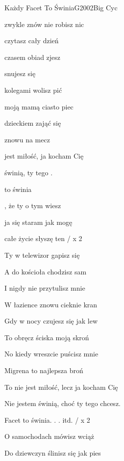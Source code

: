 \begin{song}{Każdy Facet To Świnia}{G}{2002}{Big Cyc}{}{}
  \begin{SBVerse}
     zwykle znów nie robisz nic

     czytasz cały dzień

     czasem obiad zjesz

     snujesz się 

     kolegami wolisz pić

     moją mamą ciasto piec

     dzieckiem zająć się

     znowu  na mecz

     jest miłość,  ja kocham Cię

     świnią,  ty tego .
  \end{SBVerse}
  \begin{SBChorus}
     to świnia

    , że ty o tym wiesz

     ja się staram jak mogę

     całe życie słyszę ten  / x 2
  \end{SBChorus}
  \begin{SBVerse}
    Ty w telewizor gapisz się

    A do kościoła chodzisz sam

    I nigdy nie przytulisz mnie

    W łazience znowu cieknie kran

    Gdy w nocy czujesz się jak lew

    To obręcz ściska moją skroń

    No kiedy wreszcie puścisz mnie

    Migrena to najlepsza broń

    To nie jest miłość, lecz ja kocham Cię

    Nie jestem świnią, choć ty tego chcesz.
  \end{SBVerse}
  \begin{SBChorus}
    Facet to świnia. . . itd. / x 2
  \end{SBChorus}
  \begin{SBVerse}
    O samochodach mówisz wciąż

    Do dziewczyn ślinisz się jak pies


\end{SBVerse}
\end{song}
